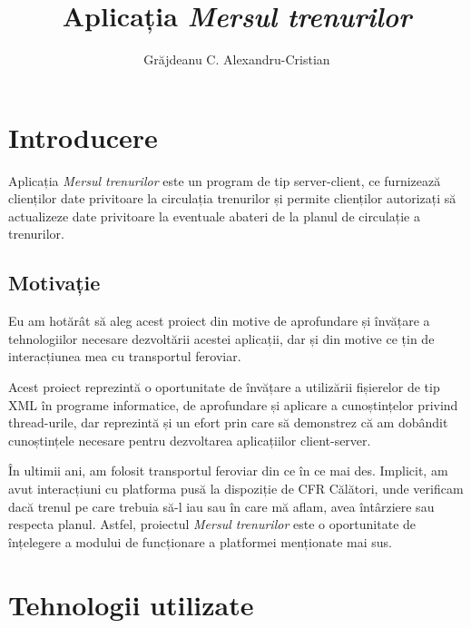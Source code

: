 \documentclass[runningheads]{llncs}
\begin{document}
%
\title{Aplicația \textit{Mersul trenurilor}}
%
%
\author{Grăjdeanu C. Alexandru-Cristian}
%
%
%
\maketitle              %
%
%
%
%
\section{Introducere}

Aplicația \textit{Mersul trenurilor} este un program de tip server-client, ce furnizează clienților date privitoare la circulația trenurilor și permite clienților autorizați să actualizeze date privitoare la eventuale abateri de la planul de circulație a trenurilor.

\subsection{Motivație}
Eu am hotărât să aleg acest proiect din motive de aprofundare și învățare a tehnologiilor necesare dezvoltării acestei aplicații, dar și din motive ce țin de interacțiunea mea cu transportul feroviar.

Acest proiect reprezintă o oportunitate de învățare a utilizării fișierelor de tip XML în programe informatice, de aprofundare și aplicare a cunoștințelor privind thread-urile, dar reprezintă și un efort prin care să demonstrez că am dobândit cunoștințele necesare pentru dezvoltarea aplicațiilor client-server.

În ultimii ani, am folosit transportul feroviar din ce în ce mai des. Implicit, am avut interacțiuni cu platforma pusă la dispoziție de CFR Călători, unde verificam dacă trenul pe care trebuia să-l iau sau în care mă aflam, avea întârziere sau respecta planul. Astfel, proiectul \textit{Mersul trenurilor} este o oportunitate de înțelegere a modului de funcționare a platformei menționate mai sus. 

\section{Tehnologii utilizate}
\end{document}
